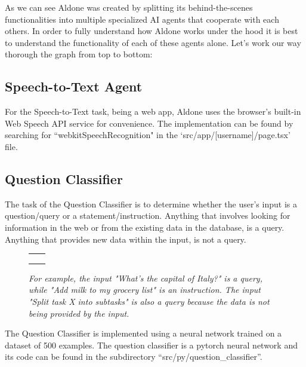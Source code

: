 \documentclass{article}
\begin{document}
As we can see Aldone was created by splitting its behind-the-scenes functionalities into multiple specialized AI agents that cooperate with each others. In order to fully understand how Aldone works under the hood it is best to understand the functionality of each of these agents alone. Let's work our way thorough the graph from top to bottom:

\subsection*{\color{draculayellow}Speech-to-Text Agent}
For the Speech-to-Text task, being a web app, Aldone uses the browser's built-in Web Speech API service for convenience. The implementation can be found by searching for ``webkitSpeechRecognition" in the `src/app/[username]/page.tsx' file.

\newpage

\subsection*{\color{draculayellow}Question Classifier}
The task of the Question Classifier is to determine whether the user's input is a question/query or a statement/instruction. Anything that involves looking for information in the web or from the existing data in the database, is a query. Anything that provides new data within the input, is not a query.

\begin{figure}[H]
\begin{center}
\begin{tabular}{SS}
  \toprule
     &  \\
    \midrule
      &  \\
      &   \\
     &   \\
    \bottomrule
\end{tabular}
\end{center}
\caption{\it For example, the input "What's the capital of Italy?" is a query, while "Add milk to my grocery list" is an instruction. The input "Split task X into subtasks" is also a query because the data is not being provided by the input.} \label{faketable:mul}
\end{figure}


The Question Classifier is implemented using a neural network trained on a dataset of 500 examples.
The question classifier is a pytorch neural network and its code can be found in the subdirectory ``src/py/question\_classifier''.
\end{document}
